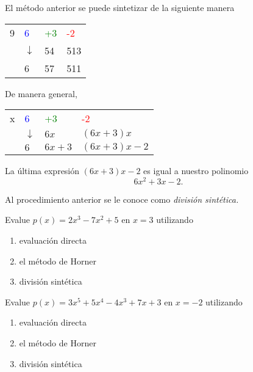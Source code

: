 	El m\'etodo anterior se puede sintetizar de la siguiente manera
	\begin{center}
		\begin{tabular}{l|lll}
			9 & \textcolor{blue}{6} & \textcolor{green}{+3} & \textcolor{red}{-2}\\
			& $\downarrow$ & 54 & 513\\\hline
			& 6 & 57 & 511
		\end{tabular}
	\end{center}
	



	De manera general, 
	\begin{center}
		\begin{tabular}{l|lll}
			x & \textcolor{blue}{6} & \textcolor{green}{+3} & \textcolor{red}{-2}\\
			& $\downarrow$ & $6x$ & $(6x+3)x$\\\hline
			& $6$ & $6x+3$ & $\left( 6x+3 \right)x-2$
		\end{tabular}
	\end{center}
	



	\begin{observacion}
		La última expresi\'on $\left( 6x+3 \right)x-2$ es igual a nuestro polinomio
		$$
		6x^{2}+3x-2.
		$$
		
		
		
		Al procedimiento anterior se le conoce como \emph{divisi\'on sint\'etica.}
	\end{observacion}
	



	\begin{problema}
		Evalue $p(x)=2x^{3}-7x^{2}+5$ en $x=3$ utilizando
		\begin{enumerate}
			\item evaluaci\'on directa 
			\item el m\'etodo de Horner 
			\item divisi\'on sint\'etica
		\end{enumerate}
		
		
	\end{problema}
	



	\begin{problema}
		Evalue $p(x)=3x^{5}+5x^{4}-4x^{3}+7x+3$ en $x=-2$ utilizando
		\begin{enumerate}
			\item evaluaci\'on directa 
			\item el m\'etodo de Horner 
			\item divisi\'on sint\'etica
		\end{enumerate} 
	\end{problema}



